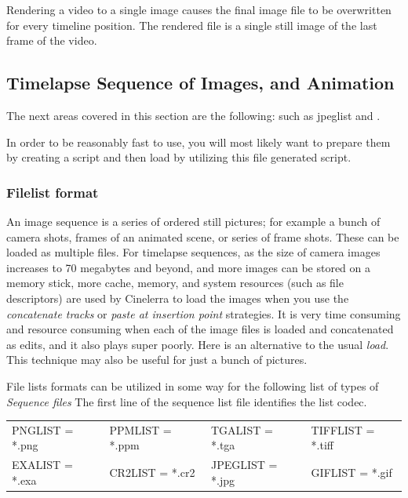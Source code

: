 Rendering a video to a single image causes the final image file to be overwritten for every timeline position. The rendered file is a single still image of the last frame of the video.

\subsection{Timelapse Sequence of Images, and Animation}%
\label{sub:timelaps_sequence_images_animation}

The next areas covered in this section are the following: 
 such as jpeglist and .

In order to be reasonably fast to use, you will most likely want to prepare them by creating a script and then load by utilizing this file generated script.

\subsubsection{Filelist format}%
\label{ssub:filelist_format}

An image sequence is a series of ordered still pictures; for example a bunch of camera shots, frames of an animated scene, or series of frame shots. These can be loaded as multiple files. For timelapse sequences, as the size of camera images increases to 70 megabytes and beyond, and more images can be stored on a memory stick, more cache, memory, and system resources (such as file descriptors) are used by Cinelerra to load the images when you use the \textit{concatenate tracks} or \textit{paste at insertion point} strategies.  It is very time consuming and resource consuming when each of the image files is loaded and concatenated as edits, and it also plays super poorly.  Here is an alternative to the usual \textit{load}.  This technique may also be useful for just a bunch of pictures.

File lists formats can be utilized in some way for the following list of types of \textit{Sequence files}  The first line of the sequence list file identifies the list codec.



\begin{center}
    \begin{tabular}{l l l l}
    PNGLIST = *.png	&	PPMLIST = *.ppm	&	TGALIST = *.tga	  &  TIFFLIST = *.tiff \\
    EXALIST = *.exa	&	CR2LIST = *.cr2	&	JPEGLIST = *.jpg	&    GIFLIST = *.gif
    \end{tabular}
\end{center}

